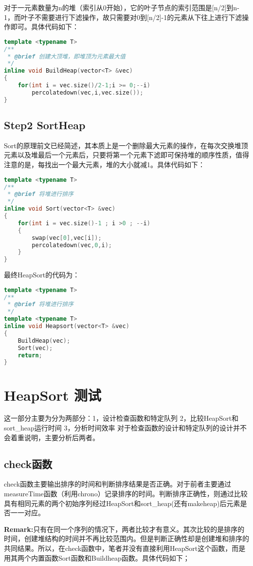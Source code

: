 \documentclass[fontset=fandol]{ctexart}
\begin{document}
对于一元素数量为n的堆（索引从0开始），它的叶子节点的索引范围是[n/2]到n-1，而叶子不需要进行下滤操作，故只需要对0到[n/2]-1的元素从下往上进行下滤操作即可。具体代码如下：
\begin{lstlisting}[language=C++, caption={BuildHeap()函数}]  
template <typename T>
/**
 * @brief 创建大顶堆，即堆顶为元素最大值
 */
inline void BuildHeap(vector<T> &vec)
{
    for(int i = vec.size()/2-1;i >= 0;--i)
        percolatedown(vec,i,vec.size());
}
\end{lstlisting}


\subsection{Step2 SortHeap}
Sort的原理前文已经简述，其本质上是一个删除最大元素的操作，在每次交换堆顶元素以及堆最后一个元素后，只要将第一个元素下滤即可保持堆的顺序性质，值得注意的是，每找出一个最大元素，堆的大小就减1。具体代码如下：
\begin{lstlisting}[language=C++, caption={Sort()函数}]  
template <typename T>
/**
 * @brief 将堆进行排序
 */
inline void Sort(vector<T> &vec)
{
    for(int i = vec.size()-1 ; i >0 ; --i)
    {
        swap(vec[0],vec[i]);
        percolatedown(vec,0,i);
    }
}
\end{lstlisting}

最终HeapSort的代码为：
\begin{lstlisting}[language=C++, caption={Heapsort()函数}]  
template <typename T>
/**
 * @brief 将堆进行排序
 */
template <typename T>
inline void Heapsort(vector<T> &vec)
{
    BuildHeap(vec);
    Sort(vec);
    return;
}
\end{lstlisting}



\section{HeapSort 测试}
这一部分主要为分为两部分：1，设计检查函数和特定队列 2，比较HeapSort和sort\_heap运行时间 3，分析时间效率
对于检查函数的设计和特定队列的设计并不会着重说明，主要分析后两者。
\subsection{check函数}
check函数主要输出排序的时间和判断排序结果是否正确。对于前者主要通过measureTime函数（利用chrono）记录排序的时间。判断排序正确性，则通过比较具有相同元素的两个初始序列经过HeapSort和sort\_heap(还有make\-heap)后元素是否一一对应。

\textbf{Remark:}只有在同一个序列的情况下，两者比较才有意义。其次比较的是排序的时间，创建堆结构的时间并不再比较范围内。但是判断正确性却是创建堆和排序的共同结果。所以，在check函数中，笔者并没有直接利用HeapSort这个函数，而是用其两个内置函数Sort函数和Buildheap函数。具体代码如下；
\end{document}
